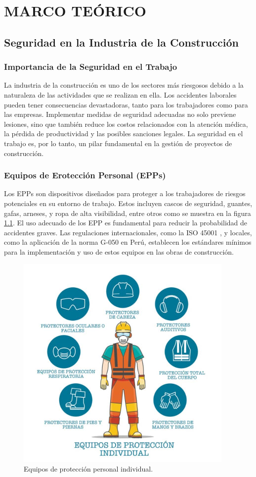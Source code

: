\chapter{MARCO TEÓRICO}

\section{Seguridad en la Industria de la Construcción}

\subsection{Importancia de la Seguridad en el Trabajo}

La industria de la construcción es uno de los sectores más riesgosos debido a la naturaleza de las actividades que se realizan en ella. Los accidentes laborales pueden tener consecuencias devastadoras, tanto para los trabajadores como para las empresas. Implementar medidas de seguridad adecuadas no solo previene lesiones, sino que también reduce los costos relacionados con la atención médica, la pérdida de productividad y las posibles sanciones legales. La seguridad en el trabajo es, por lo tanto, un pilar fundamental en la gestión de proyectos de construcción.

\subsection{Equipos de Erotección Personal (EPPs)}
Los EPPs son dispositivos diseñados para proteger a los trabajadores de riesgos potenciales en su entorno de trabajo. Estos incluyen cascos de seguridad, guantes, gafas, arneses, y ropa de alta visibilidad, entre otros como se muestra en la figura \ref{fig:epp}. El uso adecuado de los EPP es fundamental para reducir la probabilidad de accidentes graves. Las regulaciones internacionales, como la ISO 45001 \cite{darabont2017key}, y locales, como la aplicación de la norma G-050 en Perú, establecen los estándares mínimos para la implementación y uso de estos equipos en las obras de construcción.

\begin{figure}[!ht]
  \centering
  \includegraphics[width=.49\linewidth]{images/epp.jpg}
  \caption{Equipos de protección personal individual.}
  \label{fig:epp}
\end{figure}

